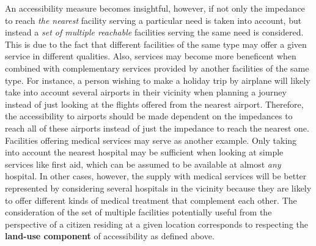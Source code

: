 
An accessibility measure becomes insightful, however, if not only the impedance to reach \textit{the nearest} facility 
serving a particular need is taken into account, but instead a \textit{set of multiple reachable} facilities serving the same 
need is considered. This is due to the fact that different facilities of the same type may offer a given service in 
different qualities. Also, services may become more beneficent when combined with complementary services provided by 
another facilities of the same type. For instance, a person wishing to make a holiday trip by airplane will likely 
take into account several airports in their vicinity when planning a journey instead of just looking at the flights 
offered from the nearest airport. Therefore, the accessibility to airports should be made dependent on the impedances 
to reach all of these airports instead of just the impedance to reach the nearest one. Facilities offering medical 
services may serve as another example. Only taking into account the nearest hospital may be sufficient when looking 
at simple services like first aid, which can be assumed to be available at almost \textit{any} hospital. In other cases, 
however, the supply with medical services will be better represented by considering several hospitals in the vicinity 
because they are likely to offer different kinds of medical treatment that complement each other. 
The consideration of the set of multiple facilities potentially useful from the perspective of a citizen residing
at a given location corresponds to respecting the \textbf{land-use component} of accessibility as defined above.

